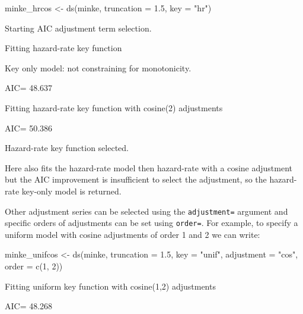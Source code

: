\documentclass[article]{jss}
\begin{document}
\begin{CodeChunk}
\begin{CodeInput}
minke_hrcos <- ds(minke, truncation = 1.5, key = "hr")
\end{CodeInput}
\begin{CodeOutput}
Starting AIC adjustment term selection.
\end{CodeOutput}
\begin{CodeOutput}
Fitting hazard-rate key function
\end{CodeOutput}
\begin{CodeOutput}
Key only model: not constraining for monotonicity.
\end{CodeOutput}
\begin{CodeOutput}
AIC= 48.637
\end{CodeOutput}
\begin{CodeOutput}
Fitting hazard-rate key function with cosine(2) adjustments
\end{CodeOutput}
\begin{CodeOutput}
AIC= 50.386
\end{CodeOutput}
\begin{CodeOutput}

Hazard-rate key function selected.
\end{CodeOutput}
\end{CodeChunk}

Here  also fits the hazard-rate model then hazard-rate with a
cosine adjustment but the AIC improvement is insufficient to select the
adjustment, so the hazard-rate key-only model is returned.

Other adjustment series can be selected using the \texttt{adjustment=}
argument and specific orders of adjustments can be set using
\texttt{order=}. For example, to specify a uniform model with cosine
adjustments of order 1 and 2 we can write:

\begin{CodeChunk}
\begin{CodeInput}
minke_unifcos <- ds(minke, truncation = 1.5, key = "unif",
                    adjustment = "cos", order = c(1, 2))
\end{CodeInput}
\begin{CodeOutput}
Fitting uniform key function with cosine(1,2) adjustments
\end{CodeOutput}
\begin{CodeOutput}
AIC= 48.268
\end{CodeOutput}
\end{CodeChunk}
\end{document}
